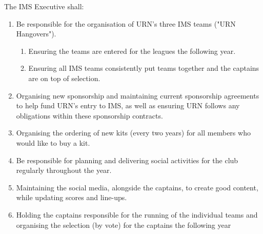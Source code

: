 \item The IMS Executive shall:
\begin{enumerate}[label*=\arabic*.]
    \item Be responsible for the organisation of URN's three IMS teams ("URN Hangovers").
          \begin{enumerate}[label*=\arabic*.]
              \item Ensuring the teams are entered for the leagues the following year.
              \item Ensuring all IMS teams consistently put teams together and the captains are on top of selection.
          \end{enumerate}
    \item Organising new sponsorship and maintaining current sponsorship agreements to help fund URN's entry to IMS, as well as ensuring URN follows any obligations within these sponsorship contracts.
    \item Organising the ordering of new kits (every two years) for all members who would like to buy a kit.
    \item Be responsible for planning and delivering social activities for the club regularly throughout the year.
    \item Maintaining the social media, alongside the captains, to create good content, while updating scores and line-ups.
    \item Holding the captains responsible for the running of the individual teams and organising the selection (by vote) for the captains the following year
\end{enumerate}
